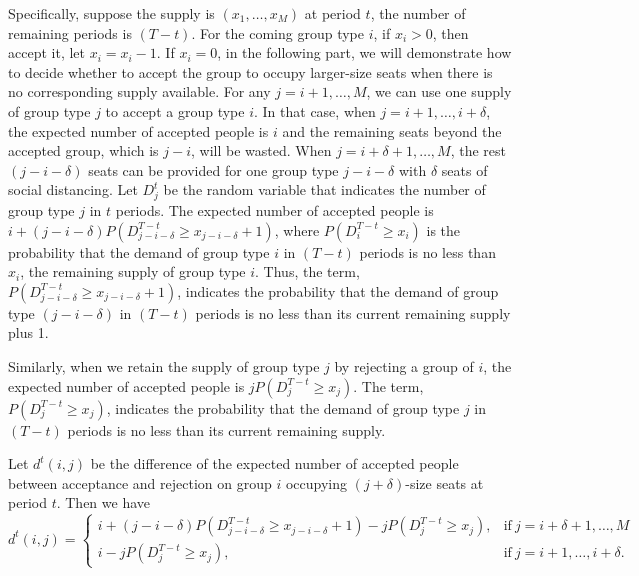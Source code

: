 Specifically, suppose the supply is $(x_1, \ldots, x_M)$ at period $t$, the number of remaining periods is $(T-t)$. For the coming group type $i$, if $x_i > 0$, then accept it, let $x_i = x_i -1$.
If $x_i = 0$, in the following part, we will demonstrate how to decide whether to accept the group to occupy larger-size seats when there is no corresponding supply available. For any $j=i+1, \ldots, M$, we can use one supply of group type $j$ to accept a group type $i$. In that case, when $j = i+1, \ldots, i+\delta$, the expected number of accepted people is $i$ and the remaining seats beyond the accepted group, which is $j-i$, will be wasted. When $j = i+\delta+1, \ldots, M$, the rest $(j-i-\delta)$ seats can be provided for one group type $j-i-\delta$ with $\delta$ seats of social distancing. Let $D_j^{t}$ be the random variable that indicates the number of group type $j$ in $t$ periods. The expected number of accepted people is $i + (j-i-\delta)P(D_{j-i-\delta}^{T-t} \geq x_{j-i-\delta}+1)$, where $P(D_i^{T-t} \geq x_i)$ is the probability that the demand of group type $i$ in $(T-t)$ periods is no less than $x_i$, the remaining supply of group type $i$. Thus, the term, $P(D_{j-i-\delta}^{T-t} \geq x_{j-i-\delta}+1)$, indicates the probability that the demand of group type $(j-i-\delta)$ in $(T-t)$ periods is no less than its current remaining supply plus 1. 

Similarly, when we retain the supply of group type $j$ by rejecting a group of $i$, the expected number of accepted people is $j P(D_{j}^{T-t} \geq x_{j})$. The term, $P(D_{j}^{T-t} \geq x_{j})$, indicates the probability that the demand of group type $j$ in $(T-t)$ periods is no less than its current remaining supply.

Let $d^{t}(i,j)$ be the difference of the expected number of accepted people between acceptance and rejection on group $i$ occupying $(j+\delta)$-size seats at period $t$. Then we have
\begin{equation*}
	d^{t}(i,j) = \begin{cases}
    i + (j-i-\delta)P(D_{j-i-\delta}^{T-t} \geq x_{j-i-\delta}+1) - j P(D_{j}^{T-t} \geq x_{j}), &\text{if}~ j = i+\delta+1, \ldots, M \\
    i - j P(D_{j}^{T-t} \geq x_{j}), &\text{if}~ j = i+1, \ldots, i+\delta.
		\end{cases}
\end{equation*}

